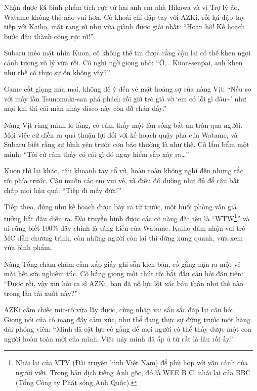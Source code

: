 \documentclass[../main.tex]{subfiles}
\begin{document}
Nhận được lời bình phẩm tích cực từ hai anh em nhà Hikawa và vị Trợ lý ảo, Watame không thể nào vui hơn. Cô khoái chí đập tay với AZKi, rồi lại đập tay tiếp với Kaiho, mặt rạng rỡ như vừa giành được giải nhất: ``Hoan hô! Kế hoạch bước đầu thành công rực rỡ!''

Subaru méo mặt nhìn Kuon, cô không thể tin được rằng cậu lại có thể khen ngợi cảnh tượng vô lý vừa rồi. Cô nghi ngờ giọng nhỏ: ``Ờ\dots\ Kuon-senpai, anh khen như thế có thực sự ổn không vậy?''

Game cất giọng mỉa mai, không để ý đến vẻ mặt hoảng sợ của nàng Vịt: ``Nếu so với mấy lần Tsunomaki-san phá phách rồi giở trò giả vờ `em có lỗi gì đâu\~{}' như mọi khi thì cái màn nhảy disco này còn đỡ chán đấy.''

Nàng Vịt rùng mình lo lắng, cô cảm thấy một làn sóng bất an tràn qua người. Mọi việc cứ diễn ra quá thuận lợi đối với kế hoạch quậy phá của Watame, và Subaru biết rằng sự bình yên trước cơn bão thường là như thế. Cô lẩm bẩm một mình: ``Tôi cứ cảm thấy có cái gì đó nguy hiểm sắp xảy ra\dots''

Kuon thì lại khác, cậu khoanh tay cổ vũ, hoàn toàn không nghĩ đến những rắc rối phía trước. Cậu muốn các em vui vẻ, và điều đó dường như đủ để cậu bất chấp mọi hậu quả: ``Tiếp đi mấy đứa!''

\ct

Tiếp theo, đúng như kế hoạch được bày ra từ trước, một buổi phỏng vấn giả tưởng bắt đầu diễn ra. Đài truyền hình được các cô nàng đặt tên là ``WTW\footnote{Nhái lại của VTV (Đài trưyền hình Việt Nam) để phù hợp với văn cảnh của người viết. Trong bản dịch tiếng Anh gốc, đó là WEE B C, nhái lại của BBC (Tổng Công ty Phát sóng Anh Quốc).}'' và ai cũng biết 100\% đây chính là sáng kiến của Watame. Kaiho đảm nhận vai trò MC dẫn chương trình, còn những người còn lại thì đứng xung quanh, vừa xem vừa bình phẩm.


Nàng Tổng chăm chăm cầm xấp giấy ghi sẵn kịch bản, cố gắng nặn ra một vẻ mặt hết sức nghiêm túc. Cô hắng giọng một chút rồi bắt đầu câu hỏi đầu tiên: ``Được rồi, vậy xin hỏi ca sĩ AZKi, bạn đã nỗ lực lột xác bản thân như thế nào trong lần tái xuất này?''

AZKi cầm chiếc mic-rô vừa lấy được, cũng nhập vai sâu sắc đáp lại câu hỏi. Giọng nói của cô mang đầy cảm xúc, như thể đang thực sự đứng trước một hàng dài phóng viên: ``Mình đã cật lực cố gắng để mọi người có thể thấy được một con người hoàn toàn mới của mình. Việc này mình đã ấp ủ từ rất là lâu rồi ấy.''
\end{document}
